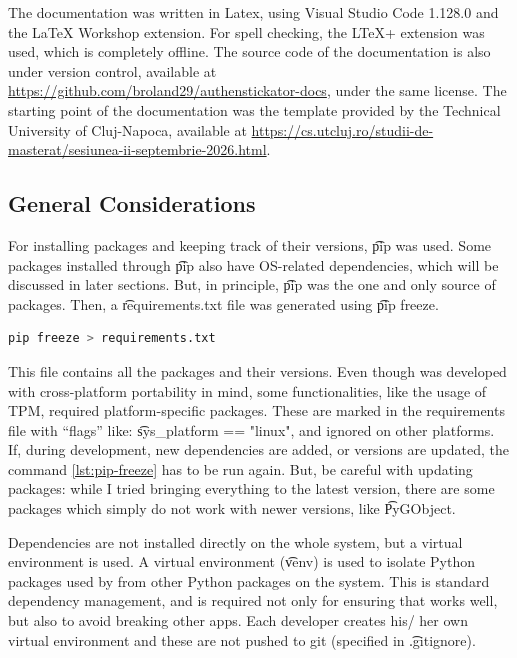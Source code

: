 The documentation was written in Latex, using Visual Studio Code 1.128.0 and the LaTeX Workshop extension.
For spell checking, the LTeX+ extension was used, which is completely offline.
The source code of the documentation is also under version control, available at \url{https://github.com/broland29/authenstickator-docs}, under the same license.
The starting point of the documentation was the template provided by the Technical University of Cluj-Napoca, available at \url{https://cs.utcluj.ro/studii-de-masterat/sesiunea-ii-septembrie-2026.html}.



\subsection{General Considerations} \label{lab:ch4-general-considerations}

For installing packages and keeping track of their versions, \t{pip} was used.
Some packages installed through \t{pip} also have OS-related dependencies, which will be discussed in later sections.
But, in principle, \t{pip} was the one and only source of packages.
Then, a \t{requirements.txt} file was generated using \t{pip freeze}.

\begin{lstlisting}[language=bash, label={lst:pip-freeze}, caption={Generating the requirements file.}]
pip freeze > requirements.txt
\end{lstlisting}

This file contains all the packages and their versions.
Even though \app{} was developed with cross-platform portability in mind, some functionalities, like the usage of TPM, required platform-specific packages.
These are marked in the requirements file with ``flags'' like: \t{sys\_platform == "linux"}, and ignored on other platforms.
If, during development, new dependencies are added, or versions are updated, the command \ref{lst:pip-freeze} has to be run again.
But, be careful with updating packages: while I tried bringing everything to the latest version, there are some packages which simply do not work with newer versions, like \t{PyGObject}.

Dependencies are not installed directly on the whole system, but a virtual environment is used.
A virtual environment (\t{venv}) is used to isolate Python packages used by \app{} from other Python packages on the system.
This is standard dependency management, and is required not only for ensuring that \app{} works well, but also to avoid breaking other apps.
Each developer creates his/ her own virtual environment and these are not pushed to git (specified in \t{.gitignore}).

